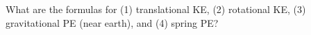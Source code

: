 

\vspace*{\fill}
\centering

What are the formulas for (1) translational KE, (2) rotational KE, (3) gravitational PE (near earth), and (4) spring PE?

\centering
\vspace*{\fill}

